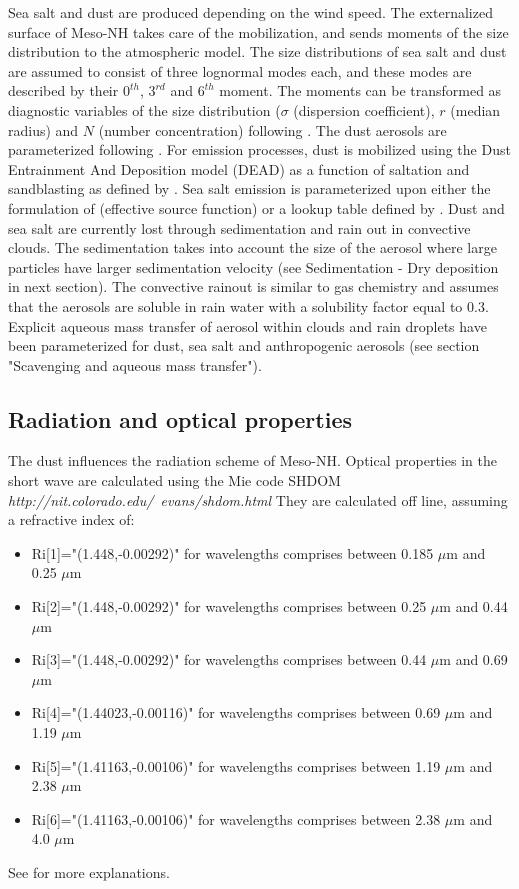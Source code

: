 Sea salt and dust are produced depending on the wind speed. 
The externalized surface
of Meso-NH takes care of the mobilization, and sends moments of the size 
distribution
to the atmospheric model. The size distributions of sea salt and dust are assumed to consist
of three lognormal modes each, and these modes are described by their $0^{th}$, $3^{rd}$ 
and
$6^{th}$ moment. The moments can be transformed as diagnostic variables of 
the size distribution ($\sigma$ (dispersion coefficient), $r$ (median radius) 
and $N$ (number concentration) following \citet{Tulet2005}.
The dust aerosols are parameterized following \citet{Grini2006}. For emission processes, dust is mobilized using the Dust Entrainment And Deposition model (DEAD) \cite[]{Zender2003} as a function of saltation and sandblasting as defined by \cite{Marticorena1995}.
Sea salt emission is parameterized upon either the formulation of \citet{Vignati2001}
(effective source function) or a lookup table defined by \citet{Schulz2004}.
Dust and sea salt are currently lost through sedimentation and rain out in convective clouds.
The sedimentation takes into account the size of the aerosol where large 
particles have larger sedimentation velocity 
(see Sedimentation - Dry deposition in next section).
The convective rainout is similar to gas chemistry and assumes that the 
aerosols are soluble in rain water with a solubility factor equal to 0.3. 
Explicit aqueous mass transfer of aerosol within clouds and rain droplets have been parameterized for dust, sea salt and anthropogenic aerosols (see section "Scavenging and aqueous mass transfer").

\subsection{Radiation and optical properties}

The dust influences the radiation scheme of Meso-NH.
Optical properties in the 
short wave are calculated using the Mie code SHDOM \citep{Evans1998} 
{\it http://nit.colorado.edu/~evans/shdom.html}
They are calculated off line, assuming a refractive index of:
\begin{itemize}
\item Ri[1]="(1.448,-0.00292)" for  wavelengths comprises between 0.185 $\mu$m and 0.25 $\mu$m
\item Ri[2]="(1.448,-0.00292)" for  wavelengths comprises between 0.25 $\mu$m and 0.44 $\mu$m
\item Ri[3]="(1.448,-0.00292)" for  wavelengths comprises between 0.44 $\mu$m and 0.69 $\mu$m
\item Ri[4]="(1.44023,-0.00116)" for  wavelengths comprises between 0.69 $\mu$m and 1.19 $\mu$m
\item Ri[5]="(1.41163,-0.00106)" for  wavelengths comprises between 1.19 $\mu$m and 2.38 $\mu$m
\item Ri[6]="(1.41163,-0.00106)" for  wavelengths comprises between 2.38 $\mu$m and 4.0 $\mu$m
\end{itemize}
See \citet{Tulet2008} for more explanations.

